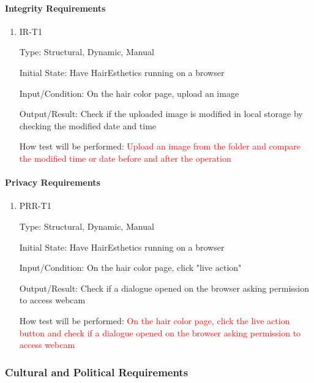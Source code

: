 \documentclass[12pt, titlepage]{article}
\begin{document}
\paragraph{Integrity Requirements}

\begin{enumerate}

\item{IR-T1\\}

Type: Structural, Dynamic, Manual
					
Initial State: Have HairEsthetics running on a browser
					
Input/Condition: On the hair color page, upload an image
					
Output/Result: Check if the uploaded image is modified in local storage by checking the modified date and time
					
How test will be performed: \textcolor{red}{Upload an image from the folder and compare the modified time or date before and after the operation}

\end{enumerate}

\paragraph{Privacy Requirements}

\begin{enumerate}

\item{PRR-T1\\}

Type: Structural, Dynamic, Manual
					
Initial State: Have HairEsthetics running on a browser
					
Input/Condition: On the hair color page, click "live action"
					
Output/Result: Check if a dialogue opened on the browser asking permission to access webcam
					
How test will be performed: \textcolor{red}{On the hair color page, click the live action button and check if a dialogue opened on the browser asking permission to access webcam}

\end{enumerate}

\subsubsection{Cultural and Political Requirements}
		
\end{document}
